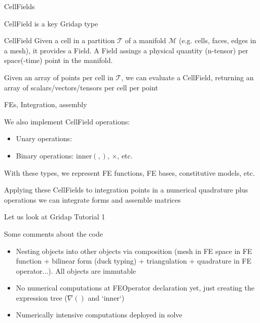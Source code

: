 \begin{frame}{CellFields}

CellField is a key Gridap type

\begin{block}{CellField}
  Given a cell in a partition $\mathcal{T}$ of a manifold $\mathcal{M}$ (e.g. cells, faces, edges in a mesh), it provides a Field. A Field assings a physical quantity (n-tensor) per space(-time) point in the manifold.

  Given an array of points per cell in $\mathcal{T}$, we can evaluate a CellField, returning an array of scalars/vectors/tensors per cell per point
\end{block}

\end{frame}

\begin{frame}{FEs, Integration, assembly}


We also implement CellField operations:

\begin{itemize}
\item Unary operations: %
\item Binary operations: inner$(,)$, $\times$, etc.
\end{itemize}

With these types, we represent FE functions, FE bases, constitutive models, etc.

Applying these CellFields to integration points in a numerical quadrature plus operations we can integrate forms and assemble matrices

Let us look at Gridap Tutorial 1
\end{frame}

\begin{frame}{Some comments about the code}

\begin{itemize}

\item Nesting objects into other objects via composition (mesh in FE space in FE function + bilinear form (duck typing) + triangulation + quadrature in FE operator...). All objects are immutable

\item No numerical computations at FEOperator declaration yet, just creating the expression tree ($\nabla()$ and `inner`)

\item Numerically intensive computations deployed in solve

\end{itemize}

\end{frame}

